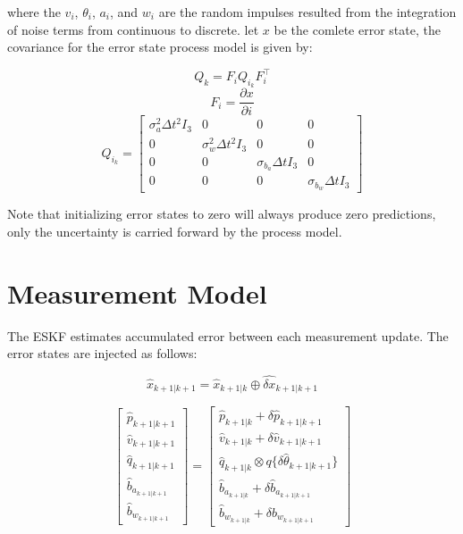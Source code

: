 \documentclass[]{article}
\begin{document}
where the $v_i$, $\theta_{i}$, $a_i$, and $w_i$ are the random impulses resulted from the integration of noise terms from continuous to discrete. let $x$ be the comlete error state, the covariance for the error state process model is given by:

\begin{equation}Q_k = F_i Q_{i_k} F_i^\intercal\end{equation}
\begin{equation}F_i = \frac{\partial x}{\partial i}\end{equation}
\begin{equation}Q_{i_k} = 
\begin{bmatrix}
\sigma_{a}^2 \Delta t^2 I_3  &                           0 &                         0 & 0 \\
                          0  & \sigma_{w}^2 \Delta t^2 I_3 &                         0 & 0 \\
                          0  &                           0 & \sigma_{b_a} \Delta t I_3 & 0 \\
                          0  &                           0 &                         0 & \sigma_{b_w} \Delta t I_3
\end{bmatrix}
\end{equation}

Note that initializing error states to zero will always produce zero predictions, only the uncertainty is carried forward by the process model.

\section{Measurement Model}

The ESKF estimates accumulated error between each measurement update. The error states are injected as follows:

\begin{equation}\hat{x}_{k+1|k+1} = \hat{x}_{k+1|k} \oplus \hat{\delta x}_{k+1|k+1}\end{equation}

\begin{equation}
\begin{bmatrix}
\hat{p}_{k+1|k+1} \\
\hat{v}_{k+1|k+1} \\
\hat{q}_{k+1|k+1} \\
\hat{b}_{a_{k+1|k+1}} \\
\hat{b}_{w_{k+1|k+1}}
\end{bmatrix} =
\begin{bmatrix}
\hat{p}_{k+1|k} + \delta \hat{p}_{k+1|k+1}\\
\hat{v}_{k+1|k} + \delta \hat{v}_{k+1|k+1}\\
\hat{q}_{k+1|k} \otimes q\{\delta \hat{\theta}_{k+1|k+1}\}\\
\hat{b}_{a_{k+1|k}} + \delta \hat{b}_{a_{k+1|k+1}}\\
\hat{b}_{w_{k+1|k}} + \delta \hat{b}_{w_{k+1|k+1}}
\end{bmatrix}
\end{equation}
\end{document}
